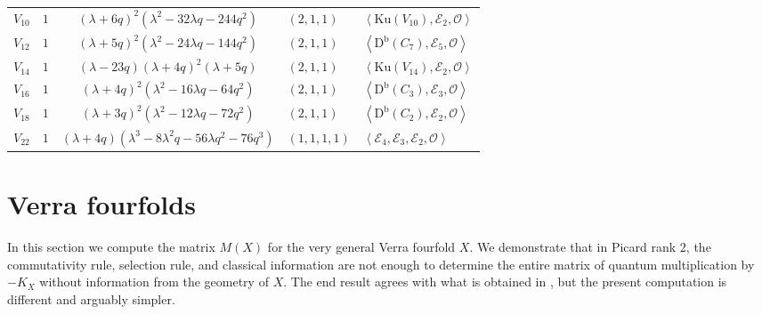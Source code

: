 \documentclass[11pt]{amsart}
\theoremstyle{plain}
\numberwithin{equation}{section}
\theoremstyle{definition}
\theoremstyle{remark}
\newcommand{\sheaf}[1]{\mathscr{#1}}
\newcommand{\OO}{\sheaf{O}}
\newcommand{\Db}{\mathrm{D}^{\mathrm{b}}}
\newcommand{\Ku}{\mathrm{Ku}}
\begin{document}
\begin{table}[htbp]
\begin{tabularx}{\textwidth}{@{} c c c >{\centering\arraybackslash}p{} X @{}}
$V_{10}$ & $1$ &
$(\lambda + 6q)^2(\lambda^2 - 32\lambda q - 244q^2)$ & $(2,1,1)$ & 
$\left\langle \Ku(V_{10}),\mathcal E_2,\OO \right\rangle$ \\

$V_{12}$ & $1$ &
$(\lambda + 5q)^2(\lambda^2 - 24\lambda q - 144q^2)$ & $(2,1,1)$ &
$\left\langle \Db(C_7),\mathcal E_5,\OO \right\rangle$ \\

$V_{14}$ & $1$ &
$(\lambda - 23q)(\lambda + 4q)^2(\lambda + 5q)$ & $(2,1,1)$ &
$\left\langle \Ku(V_{14}),\mathcal E_2,\OO \right\rangle$ \\

$V_{16}$ & $1$ &
$(\lambda + 4q)^2(\lambda^2 - 16\lambda q - 64q^2)$ & $(2,1,1)$ &
$\left\langle \Db(C_3),\mathcal E_3,\OO \right\rangle$ \\

$V_{18}$ & $1$ &
$(\lambda + 3q)^2(\lambda^2 - 12\lambda q - 72q^2)$ & $(2,1,1)$ &
$\left\langle \Db(C_2),\mathcal E_2,\OO \right\rangle$ \\

$V_{22}$ & $1$ &
$(\lambda + 4q)(\lambda^3 - 8\lambda^2 q - 56\lambda q^2 - 76q^3)$ & $(1,1,1,1)$ & 
$\left\langle \mathcal E_4,\mathcal E_3,\mathcal E_2,\OO \right\rangle$  \\
\bottomrule
\end{tabularx}
\label{tab:fano-threefold-charpoly-sod}
\end{table}
\FloatBarrier
\section{Verra fourfolds}\label{sVerraFourfolds}

In this section we compute the matrix $M(X)$ for the very general Verra fourfold $X$. We demonstrate that in Picard rank 2, the commutativity rule, selection rule, and classical information are not enough to determine the entire matrix of quantum multiplication by $-K_X$ without information from the geometry of $X$. The end result agrees with what is obtained in \cite{BGMP26}, but the present computation is different and arguably simpler. 
\end{document}
